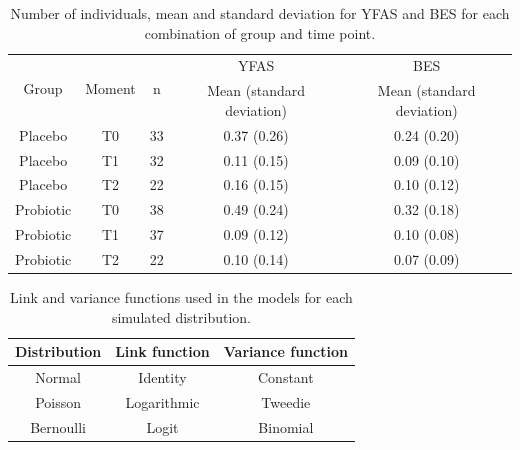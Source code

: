 \documentclass[AMA,STIX1COL]{WileyNJD-v2}
\begin{document}


%

\clearpage



\begin{table}[H]
\centering
\begin{tabular}{ccccc}
\hline
\multirow{2}{*}{Group} & \multirow{2}{*}{Moment}  & \multirow{2}{*}{n} & YFAS                  & BES                   \\ \cline{4-5} 
                       &                          &                    & Mean (standard deviation) & Mean (standard deviation) \\ \hline
Placebo                & T0                       & 33                 & 0.37 (0.26)           & 0.24 (0.20)           \\
Placebo                & T1                       & 32                 & 0.11 (0.15)           & 0.09 (0.10)           \\
Placebo                & T2                       & 22                 & 0.16 (0.15)           & 0.10 (0.12)           \\
Probiotic              & T0                       & 38                 & 0.49 (0.24)           & 0.32 (0.18)           \\
Probiotic              & T1                       & 37                 & 0.09 (0.12)           & 0.10 (0.08)           \\
Probiotic              & T2                       & 22                 & 0.10 (0.14)           & 0.07 (0.09)           \\ \hline
\end{tabular}
\caption{Number of individuals, mean and standard deviation for YFAS and BES for each combination of group and time point.}
\label{tab:tab1}
\end{table}


\begin{table}[H]
\centering
\begin{tabular}{ccc}
\hline
Distribution & Link function     & Variance function \\ \hline
Normal       & Identity          & Constant           \\
Poisson      & Logarithmic       & Tweedie             \\
Bernoulli    & Logit             & Binomial            \\ \hline
\end{tabular}
\caption{Link and variance functions used in the models for each simulated distribution.}
\label{tab2}
\end{table}
\end{document}
